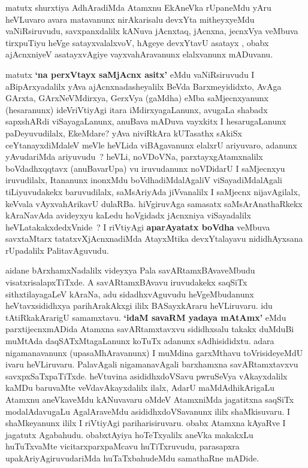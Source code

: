 \begin{artha}
matutx shurxtiya AdhAradiMda Atamxnu EkAneVka rUpaneMdu yAru heVLuvaro avara 
matavanunx nirAkarisalu devxYta mitheyxyeMdu vaNiRsiruvudu, savxpanxdalilx 
kANuva jAcnxtaq, jAcnxna, jecnxVya veMbuva tirxpuTiyu heVge satayxvalalxvoV, 
hAgeye devxYtavU asatayx , obabx ajAcnxniyeV asatayxvAgiye  vayxvahAravanunx 
elalxvanunx mADuvanu. 

matutx \textbf{`na perxVtayx saMjAcnx asitx'} eMdu vaNiRsiruvudu I aBipArxyadalilx \mdash  yAva ajAcnxnadasheyalilx 
BeVda Barxmeyididxto, AvAga GArxta, GArxNeVMdirxya, GerxVya (gaMdha) eMba 
saMjecnxyanunx (hesaranunx) ideVriVtiyAgi itara iMdirxyagaLanunx, avugaLa 
shabadx sapxshARdi viSayagaLanunx, anuBava mADuva vayxkitx I hesarugaLanunx paDeyuvudilalx,
EkeMdare? yAva niviRkAra kUTasathx sAkiSx ceYtanayxdiMdaleV meVle heVLida viBAgavanunx 
elalxrU ariyuvaro, adanunx yAvudariMda ariyuvudu~? heVLi, noVDoVNa, parxtayxgAtamxnalilx 
boVdadhxqqtavx (anuBavarUpa) vu iruvudanunx  noVDidarU I saMjecnxyu iruvudilalx, Itananunx 
inonxMdu boVdhadiMdalAgaliV viSayadiMdalAgali tiLiyuvudakekx baruvudilalx, saMsAriyAda 
jiVvanalilx I saMjecnx nijavAgilalx, keVvala vAyxvahArikavU dulaRBa. hiVgiruvAga samasatx 
saMsArAnathaRkekx kAraNavAda avideyxyu kaLedu hoVgidadx jAcnxniya viSayadalilx 
heVLatakakxdedxVnide~? I riVtiyAgi \textbf{aparAyatatx boVdha} veMbuva savxtaMtarx 
tatatxvXjAcnxnadiMda AtayxMtika devxYtalayavu nididhAyxsana rUpadalilx PalitavAguvudu.
\end{artha}
\newpage


\centerline{}

\begin{artha}
aidane bArxhamxNadalilx videyxya Pala savARtamxBAvaveMbudu visatxrisalapxTiTxde. A savARtamxBAvavu iruvudakekx saqSiTx sithxtilayagaLeV kAraNa, adu sidadhxvAguvudu heVgeMbudanunx heVtavxsididhxya parihArakAkxgi ililx BASayxkAraru heVLiruvaru. idu tAtiRkakArarigU samamxtavu. \textbf{`idaM savaRM yadaya mAtAmx'} eMdu parxtijecnxmADida Atamxna savARtamxtavxvu sididhxsalu takakx duMduBi muMtAda daqSATxMtagaLanunx koTuTx adanunx sAdhisididxtu. adara nigamanavanunx (upasaMhAravanunx) I muMdina garxMthavu toVrisideyeMdU ivaru heVLiruvaru. PalavAgali nigamanavAgali barxhamxna savARtamxtavxvu savxpxSaTxpaTiTxde. heVtuvina asididhxdoVSavu pwruSeVya vAkayxdalilx kaMDu baruvaMte veVdavAkayxdalilx ilalx, AdarU maMdAdhikArigaLu Atamxnu aneVkaveMdu kANuvavaru oMdeV AtamxniMda jagatitxna saqSiTx modalAdavugaLu AgalAraveMdu asididhxdoVSavanunx ililx shaMkisuvaru. I shaMkeyanunx ililx I riVtiyAgi pariharisiruvaru. obabx Atamxna kAyaRve I jagatutx Agabahudu. obabxtAyiya hoTeTxyalilx aneVka makakxLu huTuTxvaMte vicitarxparxpaMcavu huTiTxruvudu, parasapxra upakAriyAgiruvudariMda huTaTxbahudeMdu samathaRne mADide.
\end{artha}


